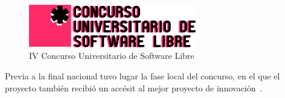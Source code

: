\begin{figure}[h!]
  \centering
  \includegraphics[width=0.65\textwidth]{8_conclusiones/imagen_logocusl}
  \caption{IV Concurso Universitario de Software Libre}
\end{figure}

Previa a la final nacional tuvo lugar la fase local del concurso, en el que el
proyecto también recibió un accésit al mejor proyecto de
innovación~\cite{cusllocal}.

